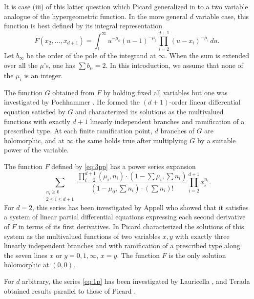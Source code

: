 \documentclass[12pt,a4paper]{article}
\theoremstyle{plain}
\theoremstyle{definition}
\theoremstyle{remark}
\numberwithin{equation}{section}
\begin{document}
It is case (iii) of this latter question which Picard generalized in \cite{Picard16b} to a two variable analogue of the hypergeometric function. In the more general $d$ variable case, this function is best defined by its integral representation
\begin{equation}\label{eq:3pp}
F(x_2, \ldots, x_{d+1}) = \int_1^{\infty} u^{-\mu_0}(u-1)^{-\mu_1} \prod_{i=2}^{d+1} (u-x_i)^{-\mu_i} \, du.
\end{equation}
Let $b_\infty$ be the order of the pole of the integrand at $\infty$. When the sum is extended over all the $\mu$'s, one has $\sum b_\mu = 2$. In this introduction, we assume that none of the $\mu_i$ is an integer.

The function $G$ obtained from $F$ by holding fixed all variables but one was investigated by Pochhammer \cite{Pochhammer}. He formed the $(d+1)$-order linear differential equation satisfied by $G$ and characterized its solutions as the multivalued functions with exactly $d+1$ linearly independent branches and ramification of a prescribed type. At each finite ramification point, $d$ branches of $G$ are holomorphic, and at $\infty$ the same holds true after multiplying $G$ by a suitable power of the variable.

The function $F$ defined by \eqref{eq:3pp} has a power series expansion
\begin{equation}\label{eq:1p}
\sum_{\substack{n_i \geq 0 \\ 2 \leq i \leq d+1}} \frac{\prod_{i=2}^{d+1} (\mu_i, n_i) \cdot (1 - \sum \mu_i, \sum n_i)}{(1 - \mu_0, \sum n_i) \cdot (\sum n_i)!} \prod_{i=2}^{d+1} x_i^{n_i}.
\end{equation}
For $d = 2$, this series has been investigated by Appell \cite{Appell} who showed that it satisfies a system of linear partial differential equations expressing each second derivative of $F$ in terms of its first derivatives. In \cite{Picard16a} Picard characterized the solutions of this system as the multivalued functions of two variables $x, y$ with exactly three linearly independent branches and with ramification of a prescribed type along the seven lines $x$ or $y = 0, 1, \infty$, $x = y$. The function $F$ is the only solution holomorphic at $(0,0)$.

For $d$ arbitrary, the series \eqref{eq:1p} has been investigated by Lauricella \cite{Lauricella}, and Terada \cite{Terada} obtained results parallel to those of Picard \cite{Picard16a}.
\end{document}
